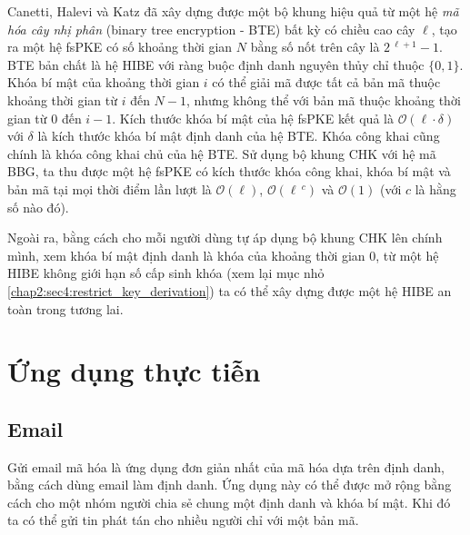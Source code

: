 \documentclass[class=report, crop=false]{standalone}
\begin{document}
				Canetti, Halevi và Katz \cite{DBLP:conf/eurocrypt/CanettiHK03} đã xây dựng được một bộ khung hiệu quả từ một hệ \textit{mã hóa cây nhị phân} (binary tree encryption - BTE) bất kỳ có chiều cao cây $\ell$, tạo ra một hệ fsPKE có số khoảng thời gian $N$ bằng số nốt trên cây là $2\,^{\ell + 1} - 1$. BTE bản chất là hệ HIBE với ràng buộc định danh nguyên thủy chỉ thuộc $\{0, 1 \}$. Khóa bí mật của khoảng thời gian $i$ có thể giải mã được tất cả bản mã thuộc khoảng thời gian từ $i$ đến $N - 1$, nhưng không thể với bản mã thuộc khoảng thời gian từ $0$ đến $i - 1$.
				\newpage
				Kích thước khóa bí mật của hệ fsPKE kết quả là $\mathcal{O}(\ell \cdot \delta)$ với $\delta$ là kích thước khóa bí mật định danh của hệ BTE. Khóa công khai cũng chính là khóa công khai chủ của hệ BTE. Sử dụng bộ khung CHK với hệ mã BBG, ta thu được một hệ fsPKE có kích thước khóa công khai, khóa bí mật và bản mã tại mọi thời điểm lần lượt là $\mathcal{O}(\ell)$, $\mathcal{O}(\ell\,^c)$ và $\mathcal{O}(1)$ (với $c$ là hằng số nào đó).

				Ngoài ra, bằng cách cho mỗi người dùng tự áp dụng bộ khung CHK lên chính mình, xem khóa bí mật định danh là khóa của khoảng thời gian $0$, từ một hệ HIBE không giới hạn số cấp sinh khóa (xem lại mục nhỏ \ref{chap2:sec4:restrict_key_derivation}) ta có thể xây dựng được một hệ HIBE an toàn trong tương lai.
	\section{Ứng dụng thực tiễn}
		\subsection{Email}
			Gửi email mã hóa là ứng dụng đơn giản nhất của mã hóa dựa trên định danh, bằng cách dùng email làm định danh. Ứng dụng này có thể được mở rộng bằng cách cho một nhóm người chia sẻ chung một định danh và khóa bí mật. Khi đó ta có thể gửi tin phát tán cho nhiều người chỉ với một bản mã.
\end{document}

